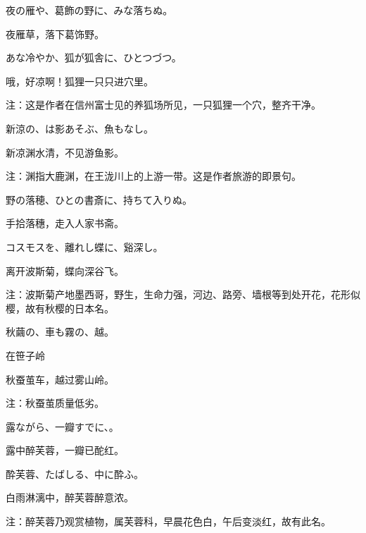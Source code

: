 \begin{haiku}
    {\FH 夜の雁や、葛飾の野に、みな落ちぬ。}

    {\FK 夜雁草，落下葛饰野。}
\end{haiku}

\begin{haiku}
    {\FH あな冷やか、狐が狐舎に、ひとつづつ。}

    {\FK 哦，好凉啊！狐狸一只只进穴里。}

    {\FT 注：这是作者在信州富士见的养狐场所见，一只狐狸一个穴，整齐干净。}
\end{haiku}

\begin{haiku}
    {\FH 新涼の、は影あそぶ、魚もなし。}

    {\FK 新凉渊水清，不见游鱼影。}

    {\FT 注：渊指大鹿渊，在王泷川上的上游一带。这是作者旅游的即景句。}
\end{haiku}

\begin{haiku}
    {\FH 野の落穂、ひとの書斎に、持ちて入りぬ。}

    {\FK 手拾落穗，走入人家书斋。}
\end{haiku}

\begin{haiku}
    {\FH コスモスを、離れし蝶に、谿深し。}

    {\FK 离开波斯菊，蝶向深谷飞。}

    {\FT 注：波斯菊产地墨西哥，野生，生命力强，河边、路旁、墙根等到处开花，花形似樱，故有秋樱的日本名。}
\end{haiku}

\begin{haiku}
    {\FH 秋繭の、車も霧の、越。}

    {\FK 在笹子岭}

    {\FK 秋蚕茧车，越过雾山岭。}

    {\FT 注：秋蚕茧质量低劣。}
\end{haiku}

\begin{haiku}
    {\FH 露ながら、一瓣すでに、。}

    {\FK 露中醉芙蓉，一瓣已酡红。}
\end{haiku}

\begin{haiku}
    {\FH 酔芙蓉、たばしる、中に酔ふ。}

    {\FK 白雨淋漓中，醉芙蓉醉意浓。}

    {\FT 注：醉芙蓉乃观赏植物，属芙蓉科，早晨花色白，午后变淡红，故有此名。}
\end{haiku}

